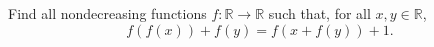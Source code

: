 Find all nondecreasing functions $f:\mathbb R\to \mathbb R$ such that, for all $x,y\in \mathbb R$, $$f(f(x))+f(y)=f(x+f(y))+1.$$

